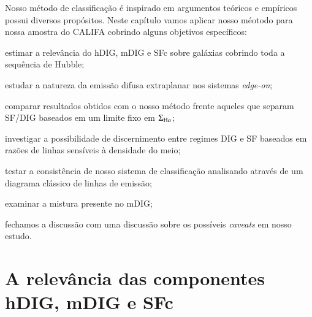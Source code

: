 Nosso método de classificação é inspirado em argumentos teóricos e empíricos possui diversos propósitos. Neste capítulo vamos aplicar nosso méotodo para nossa amostra do CALIFA cobrindo alguns objetivos específicos:
\begin{enumerate*}[label=(\roman*)]
    \item estimar a relevância do hDIG, mDIG e SFc sobre galáxias cobrindo toda a sequência de Hubble;
    \item estudar a natureza da emissão difusa extraplanar nos sistemas {\em edge-on};
    \item comparar resultados obtidos com o nosso método frente aqueles que separam SF/DIG baseados em um limite fixo em $\Sigma_{\Ha}$;
    \item investigar a possibilidade de discernimento entre regimes DIG e SF baseados em razões de linhas sensíveis à densidade do meio;
    \item testar a consistência de nosso sistema de classificação analisando através de um diagrama clássico de linhas de emissão;
    \item examinar a mistura presente no mDIG;
    \item fechamos a discussão com uma discussão sobre os possíveis {\em caveats} em nosso estudo.
\end{enumerate*}

\section{A relevância das componentes hDIG, mDIG e SFc}
\label{sec:DIGdisc:relstrenghts}


